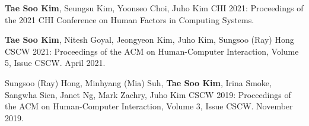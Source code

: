 \documentclass[10pt,a4paper]{article}
\newcommand{\me}{\textbf{Tae Soo Kim}}
\newenvironment{publist}{%
  \begin{list}{}{%
    \setlength{\leftmargin}{30.7pt}%
    \setlength{\labelwidth}{25.7pt}%
    \setlength{\labelsep}{5pt}%
    \setlength{\itemsep}{5.8pt}%
    \setlength{\parsep}{0pt}%
    \setlength{\topsep}{4.7pt}%
    \setlength{\partopsep}{0pt}}%
  \fontsize{10}{13.2}\selectfont\raggedright\interlinepenalty=10000\relax}{\end{list}}
\begin{document}
\begin{publist}
{\me, Seungsu Kim, Yoonseo Choi, Juho Kim}
{CHI 2021: Proceedings of the 2021 CHI Conference on Human Factors in Computing Systems.}

{\me, Nitesh Goyal, Jeongyeon Kim, Juho Kim, Sungsoo (Ray) Hong}
{CSCW 2021: Proceedings of the ACM on Human-Computer Interaction, Volume 5, Issue CSCW. April 2021.}

{Sungsoo (Ray) Hong, Minhyang (Mia) Suh, \me, Irina Smoke, Sangwha Sien, Janet Ng, Mark Zachry, Juho Kim}
{CSCW 2019: Proceedings of the ACM on Human-Computer Interaction, Volume 3, Issue CSCW. November 2019.}

\end{publist}
\end{document}
